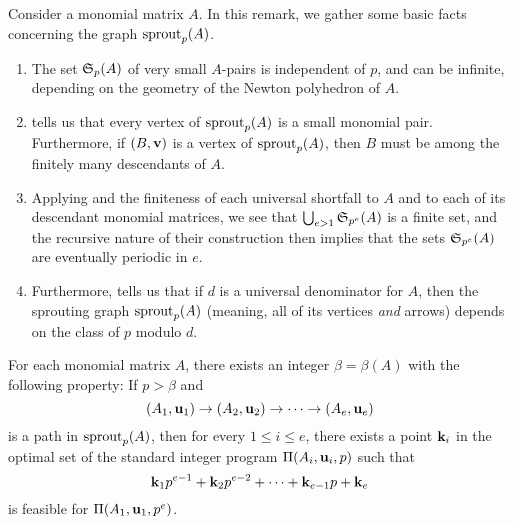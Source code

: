 \documentclass[11pt]{amsart}
\newcommand{\denom}{d}
\begin{document}
\begin{remark}
   \label{elementary1: R}
   Consider a monomial matrix $A$.
   In this remark, we gather some basic facts concerning the graph $\operatorname{sprout}_p(A)$.
\begin{enumerate} 
\item The set $\mathfrak{S}_p(A)$ of very small $A$-pairs is independent of $p$, and can be infinite, depending on the geometry of the Newton polyhedron of $A$.  

\item \label{elementary1 small pairs}  tells us that every vertex of $\operatorname{sprout}_p(A)$ is a small monomial pair.  Furthermore, if $(B,\mathbf{v})$ is a vertex of $\operatorname{sprout}_p(A)$, then $B$ must be among the finitely many descendants of $A$.

\item \label{elementary1 periodic in e} Applying  and the finiteness of each universal shortfall to $A$ and to each of its descendant monomial matrices, we see that $\bigcup_{e>1} \mathfrak{S}_{p^e}(A)$ is a finite set, and the recursive nature of their construction then implies that the sets $\mathfrak{S}_{p^e}(A)$ are eventually periodic in $e$.  

\item \label{elementary1 periodic in p} Furthermore,  tells us that if $\denom$ is a universal denominator for $A$, then the sprouting graph  $\operatorname{sprout}_p(A)$ (meaning, all of its vertices \emph{and} arrows) depends on the class of $p$ modulo $\denom$.
\end{enumerate}
\end{remark}

\begin{theorem}
\label{ILL: T}
   For each monomial matrix $A$, there exists an integer $\beta = \beta(A)$ with the following property\textup:
   If $p>\beta$ and \[ (A_1, \mathbf{u}_1) \to (A_2, \mathbf{u}_2) \to \cdots \to (A_e, \mathbf{u}_e)\] is a path in $\operatorname{sprout}_p(A)$, then for every $1 \leq i \leq e$, there exists a point $\mathbf{k}_i$ in the optimal set of the standard integer program $\Pi(A_i, \mathbf{u}_i,p)$  such that
   \[
      \mathbf{k}_1 p^{e-1} + \mathbf{k}_2 p^{e-2} + \cdots + \mathbf{k}_{e-1} p + \mathbf{k}_e
   \]
   is feasible for $\Pi(A_1, \mathbf{u}_1, p^e)$.
 \end{theorem}
\end{document}
